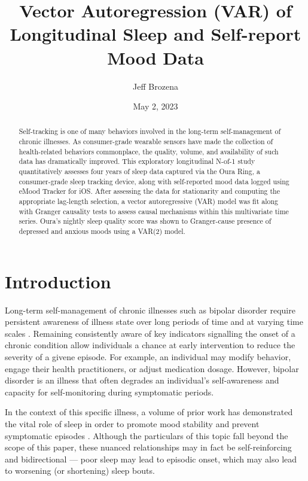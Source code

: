 \documentclass[9pt]{article}
\title{Vector Autoregression (VAR) of Longitudinal Sleep and Self-report Mood
Data}
\author{Jeff Brozena}
\affil{College of Information Sciences and Technology\\Penn State University, United States\\brozena@psu.edu}
\date{May 2, 2023}
\begin{document}
\maketitle


\begin{abstract}%

  Self-tracking is one of many behaviors involved in the long-term
  self-management of chronic illnesses. As consumer-grade wearable sensors have
  made the collection of health-related behaviors commonplace, the quality,
  volume, and availability of such data has dramatically improved. This
  exploratory longitudinal N-of-1 study quantitatively assesses four years of
  sleep data captured via the Oura Ring, a consumer-grade sleep tracking
  device, along with self-reported mood data logged using eMood Tracker for
  iOS. After assessing the data for stationarity and computing the appropriate
  lag-length selection, a vector autoregressive (VAR) model was fit along with
  Granger causality tests to assess causal mechanisms within this multivariate
  time series. Oura's nightly sleep quality score was shown to Granger-cause
  presence of depressed and anxious moods using a VAR(2) model. 

\end{abstract}

\section{Introduction}\label{introduction}

Long-term self-management of chronic illnesses such as bipolar disorder require
persistent awareness of illness state over long periods of time and at varying
time scales
\citep{murnane2016SelfmonitoringPracticesAttitudes,morton2018TakingBackReins,majid2022ExploringSelftrackingPractices}.
Remaining consistently aware of key indicators signalling the onset of a
chronic condition allow individuals a chance at early intervention to reduce
the severity of a givene episode. For example, an individual may modify
behavior, engage their health practitioners, or adjust medication dosage.
However, bipolar disorder is an illness that often degrades an individual's
self-awareness and capacity for self-monitoring during symptomatic periods.

In the context of this specific illness, a volume of prior work has
demonstrated the vital role of sleep in order to promote mood stability and
prevent symptomatic episodes
\citep{harveySleep2009,murrayCircadian2010,gruberSleep2011}. Although the
particulars of this topic fall beyond the scope of this paper, these nuanced
relationships may in fact be self-reinforcing and bidirectional --- poor sleep
may lead to episodic onset, which may also lead to worsening (or shortening)
sleep bouts.
\end{document}
